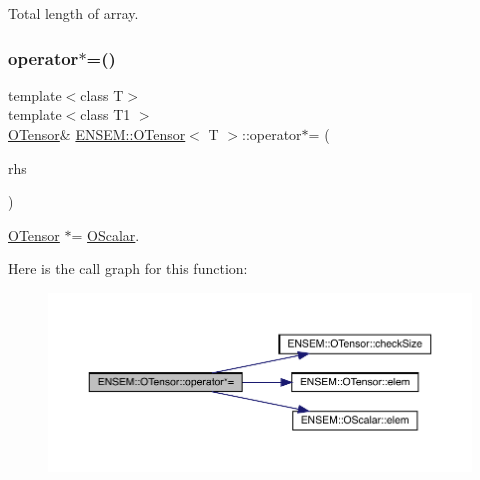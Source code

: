 Total length of array. 

\mbox{\label{classENSEM_1_1OTensor_a0326883980545068700bbdd762df5904}} 
\subsubsection{\texorpdfstring{operator$\ast$=()}{operator*=()}\hspace{0.1cm}{\footnotesize\ttfamily [1/4]}}
{\footnotesize\ttfamily template$<$class T$>$ \\
template$<$class T1 $>$ \\
\mbox{\hyperlink{classENSEM_1_1OTensor}{O\+Tensor}}\& \mbox{\hyperlink{classENSEM_1_1OTensor}{E\+N\+S\+E\+M\+::\+O\+Tensor}}$<$ T $>$\+::operator$\ast$= (\begin{DoxyParamCaption}\item[{const \mbox{\hyperlink{classENSEM_1_1OScalar}{O\+Scalar}}$<$ T1 $>$ \&}]{rhs }\end{DoxyParamCaption})\hspace{0.3cm}{\ttfamily [inline]}}



\mbox{\hyperlink{classENSEM_1_1OTensor}{O\+Tensor}} $\ast$= \mbox{\hyperlink{classENSEM_1_1OScalar}{O\+Scalar}}. 

Here is the call graph for this function\+:
\nopagebreak
\begin{figure}[H]
\begin{center}
\leavevmode
\includegraphics[width=350pt]{da/d8a/classENSEM_1_1OTensor_a0326883980545068700bbdd762df5904_cgraph}
\end{center}
\end{figure}
\mbox{\label{classENSEM_1_1OTensor_a0326883980545068700bbdd762df5904}} 
